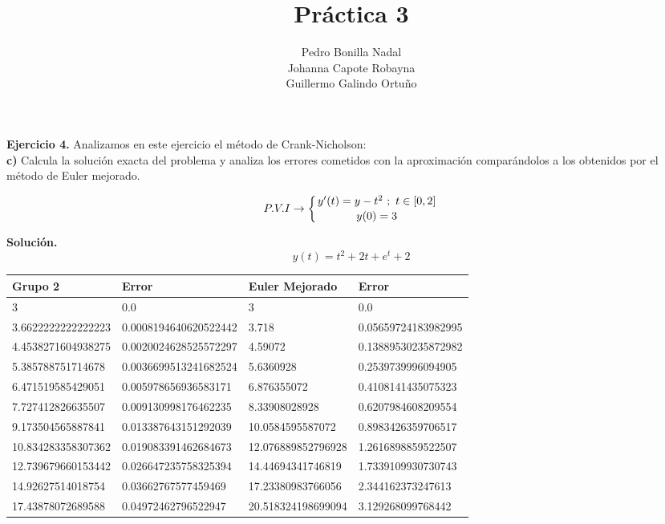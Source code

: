 \documentclass[11pt]{article}
\title{\textbf{Práctica 3}}
\author{Pedro Bonilla Nadal\\
		Johanna Capote Robayna\\
		Guillermo Galindo Ortuño}
\date{}
\begin{document}
\maketitle

\textbf{Ejercicio 4.} Analizamos en este ejercicio el método de Crank-Nicholson: \\

\textbf{c)} Calcula la solución exacta del problema y analiza los errores cometidos con la aproximación comparándolos a los obtenidos por el método de Euler mejorado.

$$P.V.I  \rightarrow  \left\lbrace
y'(t) = y - t^2 \  ;\  t \in [0,2] \atop
y(0) = 3
\right. $$

\textbf{Solución.}
$$y(t) = t^2 + 2 t + e^t + 2$$

\begin{table}[h]
\centering

\begin{tabular}{|l|l|l|l|}
\hline
Grupo 2            & Error                 & Euler Mejorado     & Error               \\ \hline
3                  & 0.0                   & 3                  & 0.0                 \\ \hline
3.6622222222222223 & 0.0008194640620522442 & 3.718              & 0.05659724183982995 \\ \hline
4.4538271604938275 & 0.0020024628525572297 & 4.59072            & 0.13889530235872982 \\ \hline
5.385788751714678  & 0.0036699513241682524 & 5.6360928          & 0.2539739996094905  \\ \hline
6.471519585429051  & 0.005978656936583171  & 6.876355072        & 0.4108141435075323  \\ \hline
7.727412826635507  & 0.009130998176462235  & 8.33908028928      & 0.6207984608209554  \\ \hline
9.173504565887841  & 0.013387643151292039  & 10.0584595587072   & 0.8983426359706517  \\ \hline
10.834283358307362 & 0.019083391462684673  & 12.076889852796928 & 1.2616898859522507  \\ \hline
12.739679660153442 & 0.026647235758325394  & 14.44694341746819  & 1.7339109930730743  \\ \hline
14.92627514018754  & 0.03662767577459469   & 17.23380983766056  & 2.344162373247613   \\ \hline
17.43878072689588  & 0.04972462796522947   & 20.518324198699094 & 3.129268099768442   \\ \hline
\end{tabular}
\end{table}
\end{document}
